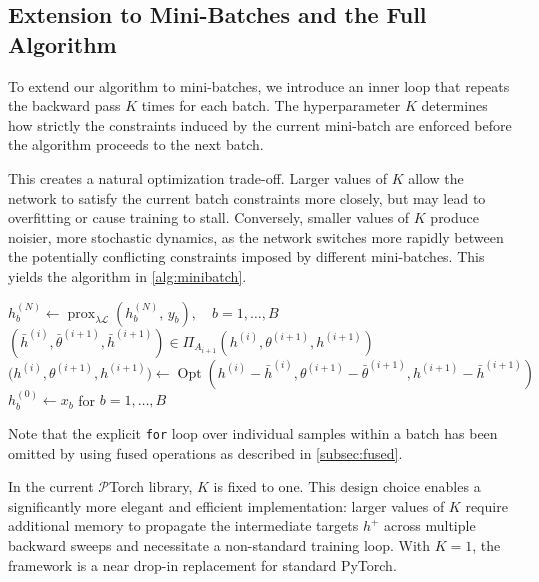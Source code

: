 \subsection
{Extension to Mini-Batches and the Full Algorithm}
To extend our algorithm to mini-batches, we introduce an inner loop that repeats the backward pass $K$ times for each batch. The hyperparameter $K$ determines how strictly the constraints induced by the current mini-batch are enforced before the algorithm proceeds to the next batch.

This creates a natural optimization trade-off. Larger values of $K$ allow the network to satisfy the current batch constraints more closely, but may lead to overfitting or cause training to stall. Conversely, smaller values of $K$ produce noisier, more stochastic dynamics, as the network switches more rapidly between the potentially conflicting constraints imposed by different mini-batches. This yields the algorithm in \cref{alg:minibatch}. 
\begin{algorithm}[htbp] 
\caption{Mini-Batch $\mathcal{P}$Torch}
\label{alg:minibatch}
\begin{algorithmic}[1]

\State $h^{(N)}_b \gets \operatorname{prox}_{\lambda \mathcal{L}}\!\left(h^{(N)}_b,\, y_b\right), \quad b=1,\ldots,B$
 
     
        \State $(\bar h^{(i)}, \bar \theta^{(i+1)}, \bar h^{(i+1)}) \in \Pi_{A_{i+1}}(h^{(i)}, \theta^{(i+1)}, h^{(i+1)})$ 
        \State $\bigl(h^{(i)},\theta^{(i+1)},h^{(i+1)}\bigr) \gets  \operatorname{Opt}\!\left( h^{(i)} - \bar{h}^{(i)}, \theta^{(i+1)} - \bar\theta^{(i+1)}, h^{(i+1)} - \bar{h}^{(i+1)}  \right)$
    \EndFor
\EndFor
\State $h^{(0)}_b \gets x_b$ for $b=1,\ldots,B$
\end{algorithmic}
\end{algorithm}

Note that the explicit \texttt{for} loop over individual samples within a batch has been omitted by using fused operations as described in \cref{subsec:fused}.

In the current $\mathcal{P}$Torch library, $K$ is fixed to one. This design choice enables a significantly more elegant
and efficient implementation: larger values of $K$ require additional memory to propagate the
intermediate targets $h^+$ across multiple backward sweeps and necessitate a non-standard training
loop. With $K=1$, the framework is a near drop-in replacement for standard PyTorch.
